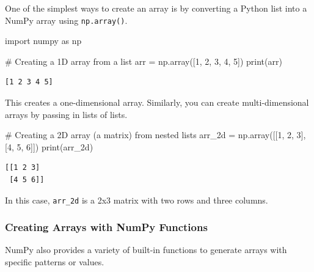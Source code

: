 \documentclass[
  letterpaper,
  DIV=11,
  numbers=noendperiod]{scrreprt}
\newenvironment{Shaded}{\begin{snugshade}}{\end{snugshade}}
\newcommand{\BuiltInTok}[1]{\textcolor[rgb]{0.00,0.23,0.31}{#1}}
\newcommand{\CommentTok}[1]{\textcolor[rgb]{0.37,0.37,0.37}{#1}}
\newcommand{\DecValTok}[1]{\textcolor[rgb]{0.68,0.00,0.00}{#1}}
\newcommand{\ImportTok}[1]{\textcolor[rgb]{0.00,0.46,0.62}{#1}}
\newcommand{\NormalTok}[1]{\textcolor[rgb]{0.00,0.23,0.31}{#1}}
\newcommand{\OperatorTok}[1]{\textcolor[rgb]{0.37,0.37,0.37}{#1}}
\begin{document}
One of the simplest ways to create an array is by converting a Python
list into a NumPy array using \texttt{np.array()}.

\begin{Shaded}
\begin{Highlighting}[]
\ImportTok{import}\NormalTok{ numpy }\ImportTok{as}\NormalTok{ np}

\CommentTok{\# Creating a 1D array from a list}
\NormalTok{arr }\OperatorTok{=}\NormalTok{ np.array([}\DecValTok{1}\NormalTok{, }\DecValTok{2}\NormalTok{, }\DecValTok{3}\NormalTok{, }\DecValTok{4}\NormalTok{, }\DecValTok{5}\NormalTok{])}
\BuiltInTok{print}\NormalTok{(arr)}
\end{Highlighting}
\end{Shaded}

\begin{verbatim}
[1 2 3 4 5]
\end{verbatim}

This creates a one-dimensional array. Similarly, you can create
multi-dimensional arrays by passing in lists of lists.

\begin{Shaded}
\begin{Highlighting}[]
\CommentTok{\# Creating a 2D array (a matrix) from nested lists}
\NormalTok{arr\_2d }\OperatorTok{=}\NormalTok{ np.array([[}\DecValTok{1}\NormalTok{, }\DecValTok{2}\NormalTok{, }\DecValTok{3}\NormalTok{], [}\DecValTok{4}\NormalTok{, }\DecValTok{5}\NormalTok{, }\DecValTok{6}\NormalTok{]])}
\BuiltInTok{print}\NormalTok{(arr\_2d)}
\end{Highlighting}
\end{Shaded}

\begin{verbatim}
[[1 2 3]
 [4 5 6]]
\end{verbatim}

In this case, \texttt{arr\_2d} is a 2x3 matrix with two rows and three
columns.

\hypertarget{creating-arrays-with-numpy-functions}{%
\subsubsection{Creating Arrays with NumPy
Functions}\label{creating-arrays-with-numpy-functions}}

NumPy also provides a variety of built-in functions to generate arrays
with specific patterns or values.
\end{document}

